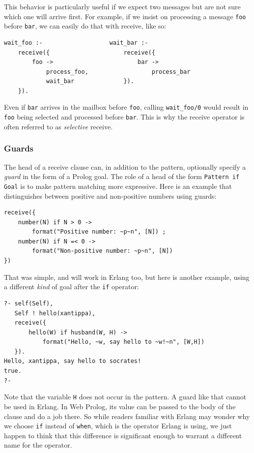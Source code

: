 \noindent This behavior is particularly useful if we expect two messages but are not sure which one will arrive first. For example, if we insist on processing a message \texttt{foo} before \texttt{bar}, we can easily do that with receive, like so:

\begin{verbatim}
wait_foo :-                   wait_bar :-
    receive({                     receive({
        foo ->                        bar ->
            process_foo,                  process_bar
            wait_bar              }).                             
    }).
\end{verbatim}

\noindent Even if \texttt{bar} arrives in the mailbox before \texttt{foo}, calling \texttt{wait\_foo/0} would result in \texttt{foo} being selected and processed before \texttt{bar}. This is why the receive operator is often referred to as \textit{selective} receive. 

\subsubsection{Guards}\label{sec:receive-guards}

The head of a receive clause can, in addition to the pattern, optionally specify a \textit{guard} in the form of a Prolog goal. The role of a head of  the form \texttt{Pattern\,if\,Goal} is to make pattern matching more expressive. Here is an example that distinguishes between positive and non-positive numbers using guards:

\begin{verbatim}
receive({
    number(N) if N > 0 ->
        format("Positive number: ~p~n", [N]) ;
    number(N) if N =< 0 ->
        format("Non-positive number: ~p~n", [N])
})
\end{verbatim}

\noindent That was simple, and will work in Erlang too, but here is another example, using a different \textit{kind} of goal after the \texttt{if} operator:

\begin{verbatim}
?- self(Self),
   Self ! hello(xantippa),
   receive({
       hello(W) if husband(W, H) ->
           format("Hello, ~w, say hello to ~w!~n", [W,H])
   }).
Hello, xantippa, say hello to socrates!
true.
?-
\end{verbatim}

\noindent Note that the variable \texttt{H} does not occur in the pattern. A guard like that cannot be used in Erlang. In Web Prolog, its value can be passed to the body of the clause and do a job there. So while readers familiar with Erlang may wonder why we choose \texttt{if} instead of \texttt{when}, which is the operator Erlang is using, we just happen to think that this difference is significant enough to warrant a different name for the operator.


